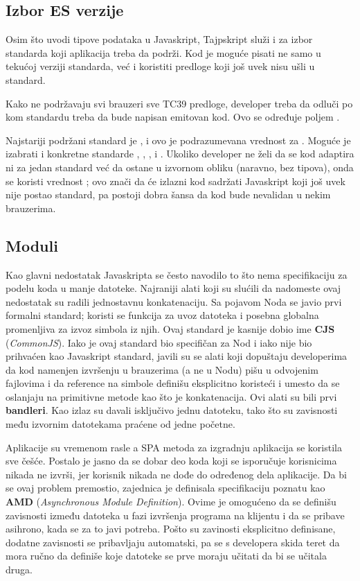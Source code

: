 \subsection{Izbor ES verzije}

Osim što uvodi tipove podataka u Javaskript, Tajpskript služi i za izbor standarda koji aplikacija treba da podrži.
Kod je moguće pisati ne samo u tekućoj verziji standarda, već i koristiti predloge koji još uvek nisu ušli u standard.

Kako ne podržavaju svi brauzeri sve TC39 predloge, developer treba da odluči po kom standardu treba da bude napisan emitovan kod.
Ovo se određuje poljem .

Najstariji podržani standard je , i ovo je podrazumevana vrednost za .
Moguće je izabrati i konkretne standarde , , ,  i .
Ukoliko developer ne želi da se kod adaptira ni za jedan standard već da ostane u izvornom obliku (naravno, bez tipova), onda se koristi vrednost ; ovo znači da će izlazni kod sadržati Javaskript koji još uvek nije postao standard, pa postoji dobra šansa da kod bude nevalidan u nekim brauzerima.

\subsection{Moduli}

Kao glavni nedostatak Javaskripta se često navodilo to što nema specifikaciju za podelu koda u manje datoteke.
Najraniji alati koji su slućili da nadomeste ovaj nedostatak su radili jednostavnu konkatenaciju.
Sa pojavom Noda se javio prvi formalni standard; koristi se funkcija  za uvoz datoteka i posebna globalna promenljiva  za izvoz simbola iz njih.
Ovaj standard je kasnije dobio ime \textbf{CJS} (\textsl{CommonJS}).
Iako je ovaj standard bio specifičan za Nod i iako nije bio prihvaćen kao Javaskript standard, javili su se alati koji dopuštaju developerima da kod namenjen izvršenju u brauzerima (a ne u Nodu) pišu u odvojenim fajlovima i da reference na simbole definišu eksplicitno koristeći  i  umesto da se oslanjaju na primitivne metode kao što je konkatenacija.
Ovi alati su bili prvi \textbf{bandleri}.
Kao izlaz su davali isključivo jednu  datoteku, tako što su zavisnosti među izvornim datotekama praćene od jedne početne.

Aplikacije su vremenom rasle a SPA metoda za izgradnju aplikacija se koristila sve češće.
Postalo je jasno da se dobar deo koda koji se isporučuje korisnicima nikada ne izvrši, jer korisnik nikada ne dođe do određenog dela aplikacije.
Da bi se ovaj problem premostio, zajednica je definisala specifikaciju poznatu kao \textbf{AMD} (\textsl{Asynchronous Module Definition}).
Ovime je omogućeno da se definišu zavisnosti između datoteka u fazi izvršenja programa na klijentu i da se pribave asihrono, kada se za to javi potreba.
Pošto su zavinosti eksplicitno definisane, dodatne zavisnosti se pribavljaju automatski, pa se s developera skida teret da mora ručno da definiše koje datoteke se prve moraju učitati da bi se učitala druga.

